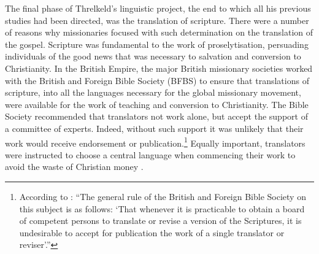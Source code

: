 {The final phase of Threlkeld’s linguistic project, the end to which all his previous studies had been directed, was the translation of scripture. There were a number of reasons why missionaries focused with such determination on the translation of the gospel. Scripture was fundamental to the work of proselytisation, persuading individuals of the good news that was necessary to salvation and conversion to Christianity. In the British Empire, the major British missionary societies worked with the British and Foreign Bible Society (BFBS) to ensure that translations of scripture, into all the languages necessary for the global missionary movement, were available for the work of teaching and conversion to Christianity. The Bible Society recommended that translators not work alone, but accept the support of a committee of experts. Indeed, without such support it was unlikely that their work would receive endorsement or publication.\footnote{According to \citet[398]{bliss_encyclopaedia_1891}: “The general rule of the British and Foreign Bible Society on this subject is as follows: ‘That whenever it is practicable to obtain a board of competent persons to translate or revise a version of the Scriptures, it is undesirable to accept for publication the work of a single translator or reviser’.”} Equally important, translators were instructed to choose a central language when commencing their work to avoid the waste of Christian money \citep[406]{bliss_encyclopaedia_1891}.

\enlargethispage{\baselineskip}

}
